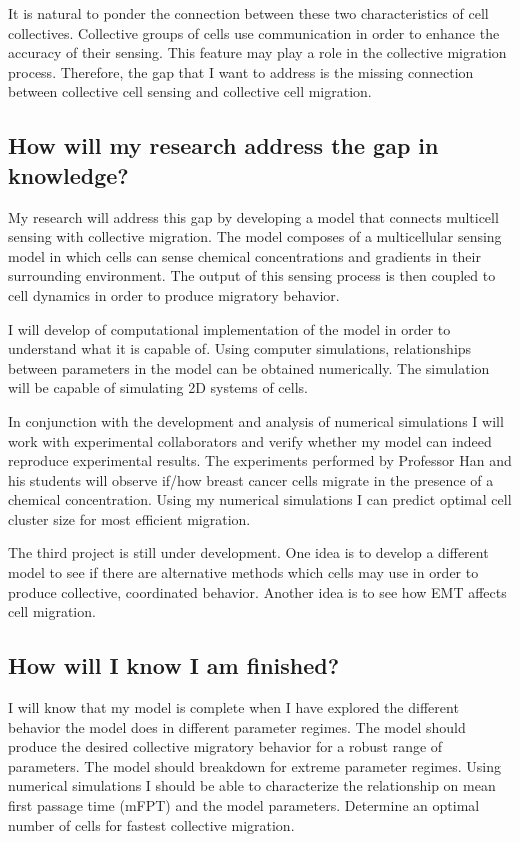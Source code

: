 \documentclass[a4paper]{article}
\begin{document}
It is natural to ponder the connection between these two characteristics of cell collectives. Collective groups of cells use communication in order to enhance the accuracy of their sensing. This feature may play a role in the collective migration process. Therefore, the gap that I want to address is the missing connection between collective cell sensing and collective cell migration.

\subsection{How will my research address the gap in knowledge?}

My research will address this gap by developing a model that connects multicell sensing with collective migration. The model composes of a multicellular sensing model in which cells can sense chemical concentrations and gradients in their surrounding environment. The output of this sensing process is then coupled to cell dynamics in order to produce migratory behavior.

I will develop of computational implementation of the model in order to understand what it is capable of. Using computer simulations, relationships between parameters in the model can be obtained numerically. The simulation will be capable of simulating 2D systems of cells.

In conjunction with the development and analysis of numerical simulations I will work with experimental collaborators and verify whether my model can indeed reproduce experimental results. The experiments performed by Professor Han and his students will observe if/how breast cancer cells migrate in the presence of a chemical concentration. Using my numerical simulations I can predict optimal cell cluster size for most efficient migration.

The third project is still under development. One idea is to develop a different model to see if there are alternative methods which cells may use in order to produce collective, coordinated behavior. Another idea is to see how EMT affects cell migration.

\subsection{How will I know I am finished?}

I will know that my model is complete when I have explored the different behavior the model does in different parameter regimes. The model should produce the desired collective migratory behavior for a robust range of parameters. The model should breakdown for extreme parameter regimes. Using numerical simulations I should be able to characterize the relationship on mean first passage time (mFPT) and the model parameters. Determine an optimal number of cells for fastest collective migration.
\end{document}
